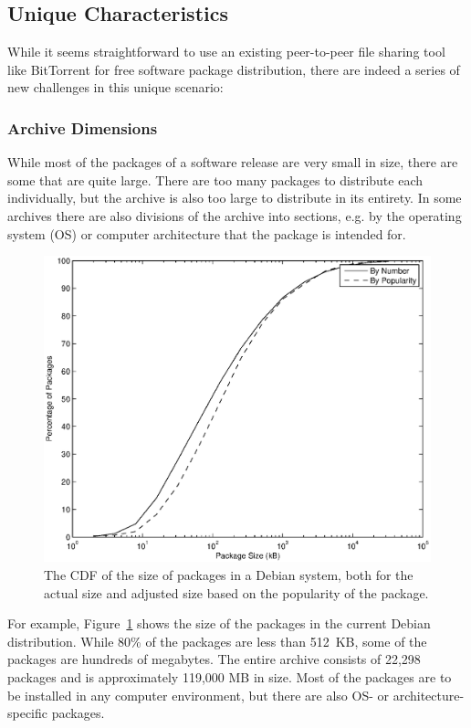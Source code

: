 \documentclass[conference]{IEEEtran}
\begin{document}
\subsection{Unique Characteristics}
\label{problems}

While it seems straightforward to use an existing peer-to-peer file sharing tool like BitTorrent for
free software package distribution, there are indeed a series of new challenges in this unique scenario:

\subsubsection{Archive Dimensions}

While most of the packages of a software release are very small in
size, there are some that are quite large. There are too many
packages to distribute each individually, but the archive is also
too large to distribute in its entirety. In some archives there are
also divisions of the archive into sections, e.g. by the operating system (OS) or computer
architecture that the package is intended for.

\begin{figure}
\centering
\includegraphics[width=\columnwidth]{apt_p2p_simulation-size_CDF.eps}
\caption{The CDF of the size of packages in a Debian system, both
for the actual size and adjusted size based on the popularity of
the package.}
\label{size_CDF}
\end{figure}

For example, Figure~\ref{size_CDF} shows the size of the packages in the
current Debian distribution. While 80\% of the packages are less than
512~KB, some of the packages are hundreds of megabytes. The entire
archive consists of 22,298 packages and is approximately 119,000 MB
in size. Most of the packages are to be installed in any computer environment, but there are 
also OS- or architecture-specific packages.
\end{document}
